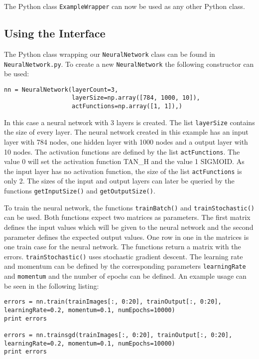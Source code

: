 \documentclass{acm_proc_article-sp}
\begin{document}
The Python class \texttt{ExampleWrapper} can now be used as any other Python class.

\subsection{Using the Interface}
The Python class wrapping our \texttt{NeuralNetwork} class can be found in \texttt{NeuralNetwork.py}. To create a new \texttt{NeuralNetwork} the following constructor can be used:

\lstset{language=Python}
\begin{lstlisting}[caption=Constructor to create a neural network]
nn = NeuralNetwork(layerCount=3,
                   layerSize=np.array([784, 1000, 10]),
                   actFunctions=np.array([1, 1]),)
\end{lstlisting}

In this case a neural network with 3 layers is created. The list \texttt{layerSize} contains the size of every layer. The neural network created in this example has an input layer with 784 nodes, one hidden layer with 1000 nodes and a output layer with 10 nodes. The activation functions are defined by the list \texttt{actFunctions}. The value 0 will set the activation function TAN\_H and the value 1 SIGMOID. As the input layer has no activation function, the size of the list \texttt{actFunctions} is only 2. The sizes of the input and output layers can later be queried by the functions \texttt{getInputSize()} and \texttt{getOutputSize()}.

To train the neural network, the functions \texttt{trainBatch()} and \texttt{trainStochastic()} can be used. Both functions expect two matrices as parameters. The first matrix defines the input values which will be given to the neural network and the second parameter defines the expected output values. One row in one in the matrices is one train case for the neural network. The functions return a matrix with the errors. \texttt{trainStochastic()} uses stochastic gradient descent. The learning rate and momentum can be defined by the corresponding parameters \texttt{learningRate} and \texttt{momentum} and the number of epochs can be defined. An example usage can be seen in the following listing:

\lstset{language=Python}
\begin{lstlisting}[caption=Usage of trainsgd() and train()]
errors = nn.train(trainImages[:, 0:20], trainOutput[:, 0:20], learningRate=0.2, momentum=0.1, numEpochs=10000)
print errors

errors = nn.trainsgd(trainImages[:, 0:20], trainOutput[:, 0:20], learningRate=0.2, momentum=0.1, numEpochs=10000)
print errors
\end{lstlisting}
\end{document}
